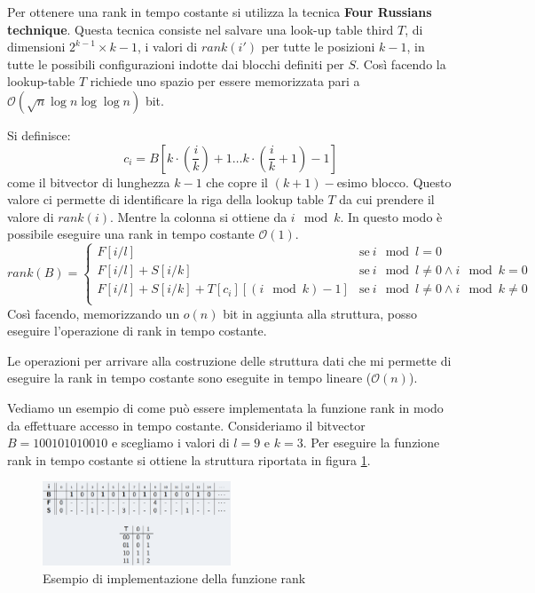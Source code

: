 Per ottenere una rank in tempo costante si utilizza la tecnica \textbf{Four
    Russians technique}. Questa tecnica consiste nel salvare una look-up table
third $T$, di dimensioni $2^{k - 1} \times k - 1$, i valori di $rank(i')$
per tutte le posizioni $k - 1$, in tutte le possibili configurazioni indotte dai
blocchi definiti per $S$. Così facendo la lookup-table $T$ richiede uno spazio
per essere memorizzata pari a $\mathcal{O}(\sqrt{n} \log n \log \log n)$ bit.

Si definisce:
\begin{equation}
    c_i = B \left[k \cdot \left(\frac{i}{k}\right) + 1 \dots k \cdot \left(\frac{i}{k} 
    + 1\right) - 1\right]
\end{equation}
come il bitvector di lunghezza $k - 1$ che copre il $(k + 1)-$esimo blocco. Questo
valore ci permette di identificare la riga della lookup table $T$ da cui prendere
il valore di $rank(i)$. Mentre la colonna si ottiene da $i \mod k$. In questo
modo è possibile eseguire una rank in tempo costante $\mathcal{O}(1)$.
\begin{equation}
    rank(B) = \begin{cases}
        F[i/l]                                   & \text{se} \ i \mod l = 0    \\
        F[i/l] + S[i/k]                          & \text{se} \ i \mod l \neq 0
        \land i \mod k = 0                                                     \\
        F[i/l] + S[i/k] + T[c_i][(i \mod k) - 1] & \text{se} \ i \mod l \neq 0
        \land i \mod k \neq 0                                                  \\
    \end{cases}
\end{equation}
Così facendo, memorizzando un $o(n)$ bit in aggiunta alla struttura, posso
eseguire l'operazione di rank in tempo costante.
\begin{nota}
    Le operazioni per arrivare alla costruzione delle struttura dati che mi
    permette di eseguire la rank in tempo costante sono eseguite in tempo lineare
    ($\mathcal{O}(n)$).
\end{nota}
\begin{esempio}
    Vediamo un esempio di come può essere implementata la funzione rank in modo
    da effettuare accesso in tempo costante. Consideriamo il bitvector
    $B = 100101010010$ e scegliamo i valori di $l = 9$ e $k = 3$. Per eseguire
    la funzione rank in tempo costante si ottiene la struttura riportata in
    figura \ref{fig:rank}.
    \begin{figure}[!ht]
        \centering
        \includegraphics[width=0.5\textwidth]{img/Strutture Dati/rank.png}
        \caption{Esempio di implementazione della funzione rank}
        \label{fig:rank}
    \end{figure}
\end{esempio}
